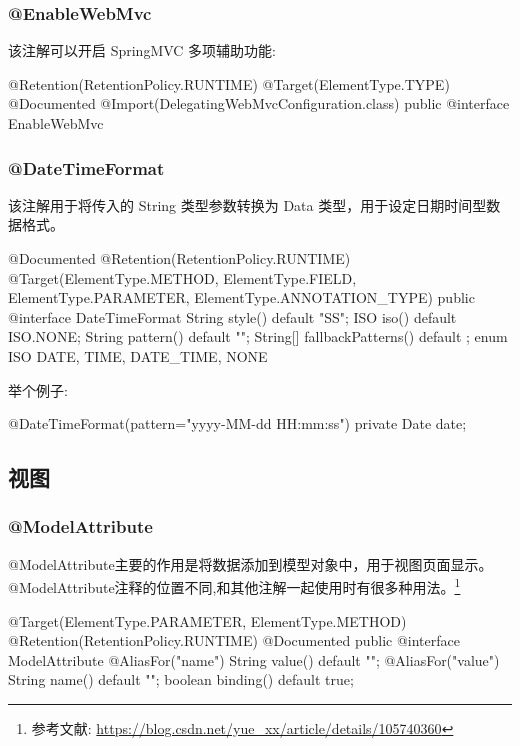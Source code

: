 \subsubsection{@EnableWebMvc}

该注解可以开启 SpringMVC 多项辅助功能:

\begin{Java}
@Retention(RetentionPolicy.RUNTIME)
@Target(ElementType.TYPE)
@Documented
@Import(DelegatingWebMvcConfiguration.class)
public @interface EnableWebMvc { }
\end{Java}

\subsubsection{@DateTimeFormat}

该注解用于将传入的 String 类型参数转换为 Data 类型，用于设定日期时间型数据格式。

\begin{Java}
@Documented
@Retention(RetentionPolicy.RUNTIME)
@Target({ElementType.METHOD, ElementType.FIELD, ElementType.PARAMETER, ElementType.ANNOTATION_TYPE})
public @interface DateTimeFormat {
    String style() default "SS";
    ISO iso() default ISO.NONE;
    String pattern() default "";
    String[] fallbackPatterns() default {};
    enum ISO { DATE, TIME, DATE_TIME, NONE }
}    
\end{Java}

举个例子:

\begin{Java}
@DateTimeFormat(pattern="yyyy-MM-dd HH:mm:ss")
private Date date;
\end{Java}


\subsection{视图}

\subsubsection{@ModelAttribute}

@ModelAttribute主要的作用是将数据添加到模型对象中，用于视图页面显示。@ModelAttribute注释的位置不同,和其他注解一起使用时有很多种用法。\footnote{参考文献: \url{https://blog.csdn.net/yue_xx/article/details/105740360}}

\begin{Java}
@Target({ElementType.PARAMETER, ElementType.METHOD})
@Retention(RetentionPolicy.RUNTIME)
@Documented
public @interface ModelAttribute {
    @AliasFor("name")
    String value() default "";
    @AliasFor("value")
    String name() default "";
    boolean binding() default true;
}
\end{Java}

